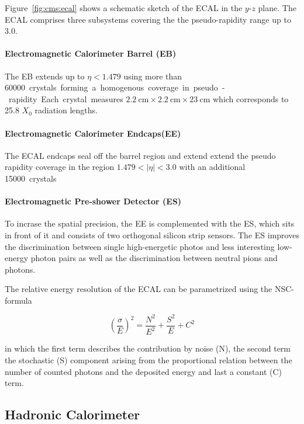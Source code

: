 Figure~\ref{fig:cms:ecal} shows a schematic sketch of the ECAL in the $y$-$z$
plane. The ECAL comprises three subsystems covering the the pseudo-rapidity
range up to 3.0. 

\paragraph{Electromagnetic Calorimeter Barrel (EB)} 
The EB extends up to $\eta < 1.479$ using more than \SI{60000} crystals forming a
homogenous coverage in pseudo-rapidity. Each crystal measures
$\SI{2.2}{\centi\meter} \times \SI{2.2}{\centi\meter} \times
\SI{23}{\centi\meter}$ which corresponds to 25.8 $X_0$ radiation lengths.

\paragraph{Electromagnetic Calorimeter Endcaps(EE)} 
The ECAL endcaps seal off the barrel region and extend extend the pseudo rapidity
coverage in the region $1.479 < |\eta| < 3.0$ with an additional \SI{15000}
crystals

\paragraph{Electromagnetic Pre-shower Detector (ES)} 
To incrase the spatial precision, the EE is complemented with the ES, which sits
in front of it and consists of two orthogonal silicon strip sensors. The ES
improves the discrimination between single high-energetic photos and less
interesting low-energy photon pairs as well as the discrimination between
neutral pions and photons.

The relative energy resolution of the ECAL can be parametrized using the NSC-formula

\begin{equation*}
    \left( \frac{\sigma}{E} \right)^2 = \frac{N^2}{E^2} + \frac{S^2}{E} + C^2
\end{equation*}

in which the first term describes the contribution by noise (N), the second
term the stochastic (S) component arising from the proportional relation between
the number of counted photons and the deposited energy and last a constant (C)
term.

\subsection{Hadronic Calorimeter}

